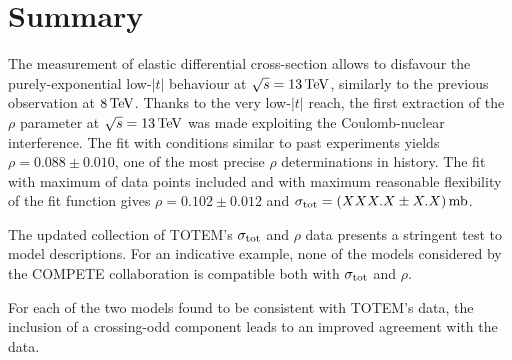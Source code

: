 \section{Summary}
\label{sec:summary}

The measurement of elastic differential cross-section allows to disfavour the purely-exponential low-$|t|$ behaviour at $\sqrt s = 13\,{\rm TeV}$, similarly to the previous observation at $8\,{\rm TeV}$. Thanks to the very low-$|t|$ reach, the first extraction of the $\rho$ parameter at $\sqrt s = 13\,{\rm TeV}$ was made exploiting the Coulomb-nuclear interference. The fit with conditions similar to past experiments yields $\rho = 0.088 \pm 0.010$, one of the most precise $\rho$ determinations in history. The fit with maximum of data points included and with maximum reasonable flexibility of the fit function gives $\rho = 0.102 \pm 0.012$ and
$\sigma_{\rm tot} = (XXX.X \pm X.X)\,{\rm mb}$.

The updated collection of TOTEM's $\sigma_{\rm tot}$ and $\rho$ data presents a stringent test to model descriptions. For an indicative example, none of the models considered by the COMPETE collaboration is compatible both with $\sigma_{\rm tot}$ and $\rho$.

For each of the two models found to be consistent with TOTEM's data, the inclusion of a crossing-odd component leads to an improved agreement with the data.
